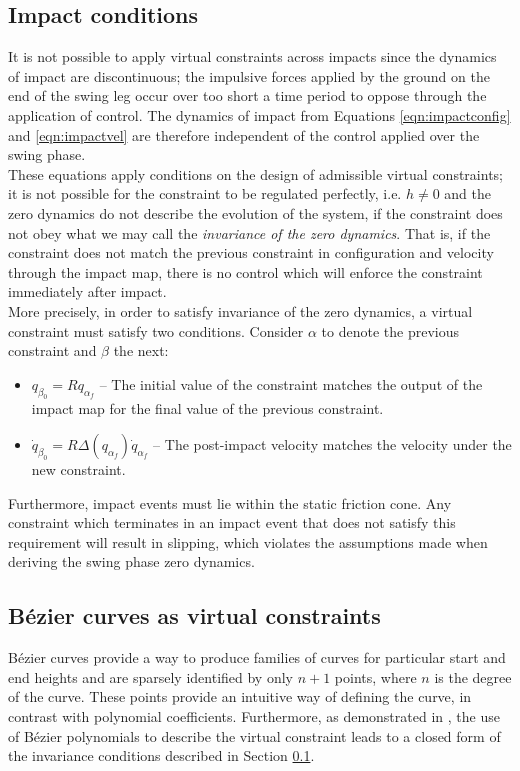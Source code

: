 \subsection{Impact conditions} \label{sec:impact}
It is not possible to apply virtual constraints across impacts since the dynamics of impact are discontinuous; the impulsive forces applied by the ground on the end of the swing leg occur over too short a time period to oppose through the application of control. The dynamics of impact from Equations \ref{eqn:impactconfig} and \ref{eqn:impactvel} are therefore independent of the control applied over the swing phase. \\

These equations apply conditions on the design of admissible virtual constraints; it is not possible for the constraint to be regulated perfectly, i.e. $h \neq 0$ and the zero dynamics do not describe the evolution of the system, if the constraint does not obey what we may call the \textit{invariance of the zero dynamics}. That is, if the constraint does not match the previous constraint in configuration and velocity through the impact map, there is no control which will enforce the constraint immediately after impact. \\

More precisely, in order to satisfy invariance of the zero dynamics, a virtual constraint must satisfy two conditions. Consider $\alpha$ to denote the previous constraint and $\beta$ the next:
\begin{itemize}
	\item $q_{\beta_0} = Rq_{\alpha_f}$ -- The initial value of the constraint matches the output of the impact map for the final value of the previous constraint.
	\item $\dot{q}_{\beta_0} = R\Delta\left(q_{\alpha_f}\right)\dot{q}_{\alpha_f}$ -- The post-impact velocity matches the velocity under the new constraint.
\end{itemize}

Furthermore, impact events must lie within the static friction cone. Any constraint which terminates in an impact event that does not satisfy this requirement will result in slipping, which violates the assumptions made when deriving the swing phase zero dynamics.

\subsection{B{\'e}zier curves as virtual constraints}
Bézier curves provide a way to produce families of curves for particular start and end heights and are sparsely identified by only $n+1$ points, where $n$ is the degree of the curve. These points provide an intuitive way of defining the curve, in contrast with polynomial coefficients. Furthermore, as demonstrated in \cite{westervelt2007feedback}, the use of Bézier polynomials to describe the virtual constraint leads to a closed form of the invariance conditions described in Section \ref{sec:impact}. \\

